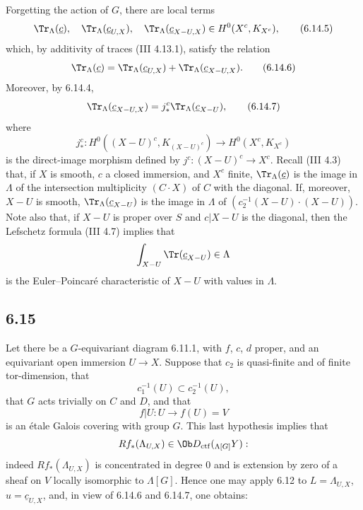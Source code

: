 Forgetting the action of $G$, there are local terms
\begin{equation}
\Tr_{\Lambda}(\underline c),\quad
\Tr_{\Lambda}(\underline c_{U,X}),\quad
\Tr_{\Lambda}(\underline c_{X-U,X})
\in H^0(X^c,K_{X^c}),
\tag{6.14.5}
\end{equation}
which, by additivity of traces (III 4.13.1), satisfy the relation
\begin{equation}
\Tr_{\Lambda}(\underline c)
=
\Tr_{\Lambda}(\underline c_{U,X})
+
\Tr_{\Lambda}(\underline c_{X-U,X}).
\tag{6.14.6}
\end{equation}
Moreover, by 6.14.4,
\begin{equation}
\Tr_{\Lambda}(\underline c_{X-U,X})
=
j_*^c\Tr_{\Lambda}(\underline c_{X-U}),
\tag{6.14.7}
\end{equation}
where
\[
j_*^c:H^0((X-U)^c,K_{(X-U)^c})\longrightarrow H^0(X^c,K_{X^c})
\]
is the direct-image morphism defined by $j^c:(X-U)^c\to X^c$. Recall (III 4.3) that, if $X$ is smooth, $c$ a closed immersion, and $X^c$ finite, $\Tr_{\Lambda}(\underline c)$ is the image in $\Lambda$ of the intersection multiplicity $(C\cdot X)$ of $C$ with the diagonal. If, moreover, $X-U$ is smooth, $\Tr_{\Lambda}(\underline c_{X-U})$ is the image in $\Lambda$ of $(c_2^{-1}(X-U)\cdot(X-U))$. Note also that, if $X-U$ is proper over $S$ and $c|X-U$ is the diagonal, then the Lefschetz formula (III 4.7) implies that
\[
\int_{X-U}\Tr(\underline c_{X-U})\in\Lambda
\]
is the Euler--Poincaré characteristic of $X-U$ with values in $\Lambda$.

\subsection*{6.15}
Let there be a $G$-equivariant diagram 6.11.1, with $f$, $c$, $d$ proper, and an equivariant open immersion $U\to X$. Suppose that $c_2$ is quasi-finite and of finite tor-dimension, that
\[
c_1^{-1}(U)\subset c_2^{-1}(U),
\]
that $G$ acts trivially on $C$ and $D$, and that
\[
f|U:U\longrightarrow f(U)=V
\]
is an étale Galois covering with group $G$. This last hypothesis implies that
\[
Rf_*(\Lambda_{U,X})\in\Ob D_{\mathrm{ctf}}({}_{\Lambda[G]}Y):
\]
indeed $Rf_*(\Lambda_{U,X})$ is concentrated in degree $0$ and is extension by zero of a sheaf on $V$ locally isomorphic to $\Lambda[G]$. Hence one may apply 6.12 to $L=\Lambda_{U,X}$, $u=\underline c_{U,X}$, and, in view of 6.14.6 and 6.14.7, one obtains:

